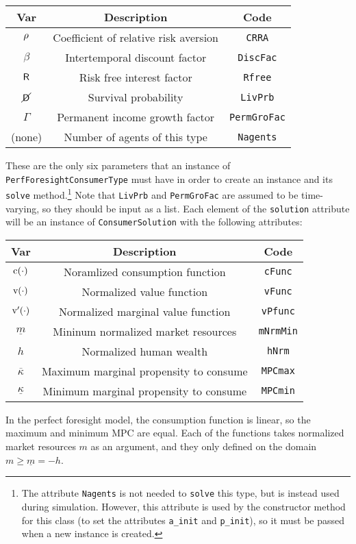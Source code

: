 \documentclass[12pt,titlepage,letterpaper]{econtex}
\begin{document}
\begin{table}[h!]
\centering
\begin{tabular}{c c c}
Var & Description & Code \\
\hline
$\rho$ & Coefficient of relative risk aversion & \texttt{CRRA} \\
$\beta$ & Intertemporal discount factor & \texttt{DiscFac} \\
$\mathsf{R}$ & Risk free interest factor & \texttt{Rfree} \\
$\cancel{\mathsf{D}}$ & Survival probability & \texttt{LivPrb} \\
$\Gamma$ & Permanent income growth factor & \texttt{PermGroFac} \\
(none) & Number of agents of this type & \texttt{Nagents}
\end{tabular}
\end{table}

These are the only six parameters that an instance of \texttt{PerfForesightConsumerType} must have in order to create an instance and its \texttt{solve} method.\footnote{The attribute \texttt{Nagents} is not needed to \texttt{solve} this type, but is instead used during simulation.  However, this attribute is used by the constructor method for this class (to set the attributes \texttt{a\_init} and \texttt{p\_init}), so it must be passed when a new instance is created.}  Note that \texttt{LivPrb} and \texttt{PermGroFac} are assumed to be time-varying, so they should be input as a list.  Each element of the \texttt{solution} attribute will be an instance of \texttt{ConsumerSolution} with the following attributes:

\begin{table}[h!]
\centering
\begin{tabular}{c c c}
Var & Description & Code \\
\hline
$\mathrm{c}(\cdot)$ & Noramlized consumption function & \texttt{cFunc} \\
$\mathrm{v}(\cdot)$ & Normalized value function & \texttt{vFunc} \\
$\mathrm{v}'(\cdot)$ & Normalized marginal value function & \texttt{vPfunc} \\
$\underline{m}$ & Mininum normalized market resources & \texttt{mNrmMin} \\
$h$ & Normalized human wealth & \texttt{hNrm} \\
$\overline{\kappa}$ & Maximum marginal propensity to consume & \texttt{MPCmax} \\
$\underline{\kappa}$ & Minimum marginal propensity to consume & \texttt{MPCmin} \\
\end{tabular}
\end{table}
In the perfect foresight model, the consumption function is linear, so the maximum and minimum MPC are equal.  Each of the functions takes normalized market resources $m$ as an argument, and they only defined on the domain $m \geq \underline{m} = -h$.
\end{document}
